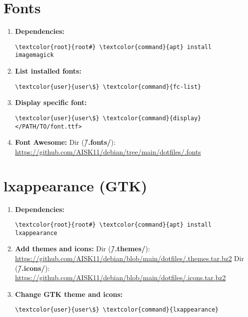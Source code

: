 \documentclass[10pt, a4paper, onecolumn, openany]{book} %
\begin{document}
\section{Fonts}
\begin{enumerate}
    \item \textbf{Dependencies:}
\begin{Verbatim}[commandchars=\\\{\}]
\textcolor{root}{root#} \textcolor{command}{apt} install imagemagick
\end{Verbatim}
    \item \textbf{List installed fonts:}
\begin{Verbatim}[commandchars=\\\{\}]
\textcolor{user}{user\$} \textcolor{command}{fc-list}
\end{Verbatim}
    \item \textbf{Display specific font:}
\begin{Verbatim}[commandchars=\\\{\}]
\textcolor{user}{user\$} \textcolor{command}{display} </PATH/TO/font.ttf>
\end{Verbatim}
    \item \textbf{Font Awesome:}
\newline Dir (\textbf{\textcolor{dir}{\~/.fonts/}}):
\newline \underline{\url{https://github.com/AISK11/debian/tree/main/dotfiles/.fonts}}
\end{enumerate}
\section{lxappearance (GTK)}
\begin{enumerate}
    \item \textbf{Dependencies:}
\begin{Verbatim}[commandchars=\\\{\}]
\textcolor{root}{root#} \textcolor{command}{apt} install lxappearance
\end{Verbatim}
    \item \textbf{Add themes and icons:}
\newline Dir (\textbf{\textcolor{dir}{\~/.themes/}}):
\newline \underline{\url{https://github.com/AISK11/debian/blob/main/dotfiles/.themes.tar.bz2}}
\newline Dir (\textbf{\textcolor{dir}{\~/.icons/}}):
\newline \underline{\url{https://github.com/AISK11/debian/blob/main/dotfiles/.icons.tar.bz2}}
    \item \textbf{Change GTK theme and icons:}
\begin{Verbatim}[commandchars=\\\{\}]
\textcolor{user}{user\$} \textcolor{command}{lxappearance}
\end{Verbatim}
\end{enumerate}
\end{document}
